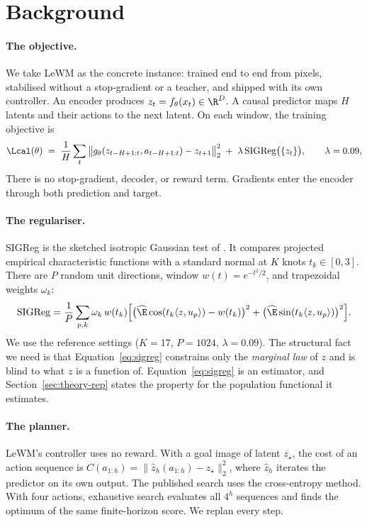 \section{Background}
\label{sec:background}

\paragraph{The objective.} We take LeWM \citep{maes2026lewm} as the concrete instance: trained end to
end from pixels, stabilised without a stop-gradient or a teacher, and shipped with its own
controller. An encoder produces $z_t=f_\theta(x_t)\in\R^D$.
A causal predictor maps $H$ latents and their actions to the next latent.
On each window, the training objective is
\begin{equation}
\label{eq:lewm}
\Lcal(\theta) \;=\; \frac{1}{H}\sum_{t} \big\| g_\theta(z_{t-H+1:t}, a_{t-H+1:t}) - z_{t+1} \big\|_2^2
\;+\; \lambda \,\mathrm{SIGReg}\big(\{z_t\}\big),
\qquad \lambda = 0.09 ,
\end{equation}
There is no stop-gradient, decoder, or reward term.
Gradients enter the encoder through both prediction and target.


\paragraph{The regulariser.} SIGReg is the sketched isotropic Gaussian test of
\citep{balestriero2025lejepa}. It compares projected empirical characteristic functions with a standard normal at $K$ knots $t_k\in[0,3]$.
There are $P$ random unit directions, window $w(t)=e^{-t^2/2}$, and trapezoidal weights $\omega_k$:
\begin{equation}
\label{eq:sigreg}
\mathrm{SIGReg} = \frac{1}{P}\sum_{p,k} \omega_k \, w(t_k)
  \Big[\big(\widehat{\E}\cos(t_k \langle z, u_p\rangle) - w(t_k)\big)^2
     + \big(\widehat{\E}\sin(t_k \langle z, u_p\rangle)\big)^2\Big].
\end{equation}
We use the reference settings ($K=17$, $P=1024$, $\lambda = 0.09$). The structural fact we need is
that Equation~\ref{eq:sigreg} constrains only the \emph{marginal law} of $z$ and is blind to what $z$
is a function of. Equation~\ref{eq:sigreg} is an estimator, and Section~\ref{sec:theory-rep} states
the property for the population functional it estimates.

\paragraph{The planner.} LeWM's controller uses no reward. With a goal image of latent $z_\star$, the
cost of an action sequence is $C(a_{1:h}) = \| \hat z_{h}(a_{1:h}) - z_\star \|_2^2$, where $\hat z_h$
iterates the predictor on its own output. The published search uses the cross-entropy method.
With four actions, exhaustive search evaluates all $4^h$ sequences and finds the optimum of the same finite-horizon score.
We replan every step.

